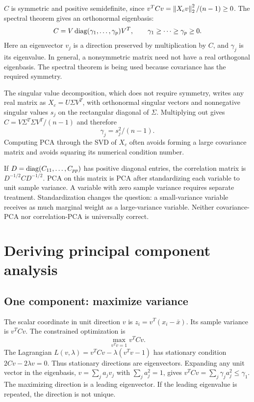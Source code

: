 $C$ is symmetric and positive semidefinite, since $v^TCv=\left\lVert X_cv\right\rVert_2^2/(n-1)\geq0$. The spectral theorem gives an orthonormal eigenbasis:
\begin{equation}
C=V\operatorname{diag}(\gamma_1,\ldots,\gamma_p)V^T,\qquad
\gamma_1\geq\cdots\geq\gamma_p\geq0.
\end{equation}
Here an eigenvector $v_j$ is a direction preserved by multiplication by $C$, and $\gamma_j$ is its eigenvalue. In general, a nonsymmetric matrix need not have a real orthogonal eigenbasis. The spectral theorem is being used because covariance has the required symmetry.

The singular value decomposition, which does not require symmetry, writes any real matrix as $X_c=U\Sigma V^T$, with orthonormal singular vectors and nonnegative singular values $s_j$ on the rectangular diagonal of $\Sigma$. Multiplying out gives $C=V\Sigma^T\Sigma V^T/(n-1)$ and therefore
\begin{equation}\label{eq:svd-pca}
\gamma_j=s_j^2/(n-1).
\end{equation}
Computing PCA through the SVD of $X_c$ often avoids forming a large covariance matrix and avoids squaring its numerical condition number.

If $D=\operatorname{diag}(C_{11},\ldots,C_{pp})$ has positive diagonal entries, the correlation matrix is $D^{-1/2}CD^{-1/2}$. PCA on this matrix is PCA after standardizing each variable to unit sample variance. A variable with zero sample variance requires separate treatment. Standardization changes the question: a small-variance variable receives as much marginal weight as a large-variance variable. Neither covariance-PCA nor correlation-PCA is universally correct.

\section{Deriving principal component analysis}
\subsection{One component: maximize variance}
The scalar coordinate in unit direction $v$ is $z_i=v^T(x_i-\bar x)$. Its sample variance is $v^TCv$. The constrained optimization is
\begin{equation}
\max_{v^Tv=1}v^TCv.
\end{equation}
The Lagrangian $L(v,\lambda)=v^TCv-\lambda(v^Tv-1)$ has stationary condition $2Cv-2\lambda v=0$. Thus stationary directions are eigenvectors. Expanding any unit vector in the eigenbasis, $v=\sum_j a_jv_j$ with $\sum_j a_j^2=1$, gives
$v^TCv=\sum_j\gamma_ja_j^2\leq\gamma_1$.
The maximizing direction is a leading eigenvector. If the leading eigenvalue is repeated, the direction is not unique.

